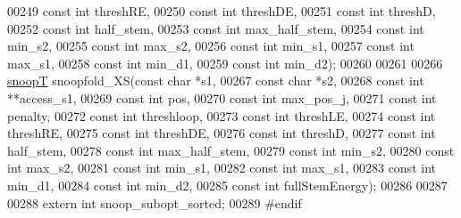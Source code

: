 \begin{DoxyCode}
00249                     \textcolor{keyword}{const} \textcolor{keywordtype}{int}   threshRE,
00250                     \textcolor{keyword}{const} \textcolor{keywordtype}{int}   threshDE,
00251                     \textcolor{keyword}{const} \textcolor{keywordtype}{int}   threshD,
00252                     \textcolor{keyword}{const} \textcolor{keywordtype}{int}   half\_stem,
00253                     \textcolor{keyword}{const} \textcolor{keywordtype}{int}   max\_half\_stem,
00254                     \textcolor{keyword}{const} \textcolor{keywordtype}{int}   min\_s2,
00255                     \textcolor{keyword}{const} \textcolor{keywordtype}{int}   max\_s2,
00256                     \textcolor{keyword}{const} \textcolor{keywordtype}{int}   min\_s1,
00257                     \textcolor{keyword}{const} \textcolor{keywordtype}{int}   max\_s1,
00258                     \textcolor{keyword}{const} \textcolor{keywordtype}{int}   min\_d1,
00259                     \textcolor{keyword}{const} \textcolor{keywordtype}{int}   min\_d2);
00260 
00261 
00266 \hyperlink{group__data__structures_structsnoopT}{snoopT} snoopfold\_XS(\textcolor{keyword}{const} \textcolor{keywordtype}{char}  *s1,
00267                     \textcolor{keyword}{const} \textcolor{keywordtype}{char}  *s2,
00268                     \textcolor{keyword}{const} \textcolor{keywordtype}{int}   **access\_s1,
00269                     \textcolor{keyword}{const} \textcolor{keywordtype}{int}   pos,
00270                     \textcolor{keyword}{const} \textcolor{keywordtype}{int}   max\_pos\_j,
00271                     \textcolor{keyword}{const} \textcolor{keywordtype}{int}   penalty,
00272                     \textcolor{keyword}{const} \textcolor{keywordtype}{int}   threshloop,
00273                     \textcolor{keyword}{const} \textcolor{keywordtype}{int}   threshLE,
00274                     \textcolor{keyword}{const} \textcolor{keywordtype}{int}   threshRE,
00275                     \textcolor{keyword}{const} \textcolor{keywordtype}{int}   threshDE,
00276                     \textcolor{keyword}{const} \textcolor{keywordtype}{int}   threshD,
00277                     \textcolor{keyword}{const} \textcolor{keywordtype}{int}   half\_stem,
00278                     \textcolor{keyword}{const} \textcolor{keywordtype}{int}   max\_half\_stem,
00279                     \textcolor{keyword}{const} \textcolor{keywordtype}{int}   min\_s2,
00280                     \textcolor{keyword}{const} \textcolor{keywordtype}{int}   max\_s2,
00281                     \textcolor{keyword}{const} \textcolor{keywordtype}{int}   min\_s1,
00282                     \textcolor{keyword}{const} \textcolor{keywordtype}{int}   max\_s1,
00283                     \textcolor{keyword}{const} \textcolor{keywordtype}{int}   min\_d1,
00284                     \textcolor{keyword}{const} \textcolor{keywordtype}{int}   min\_d2,
00285                     \textcolor{keyword}{const} \textcolor{keywordtype}{int}   fullStemEnergy);
00286 
00287 
00288 \textcolor{keyword}{extern} \textcolor{keywordtype}{int} snoop\_subopt\_sorted;
00289 \textcolor{preprocessor}{#endif}
\end{DoxyCode}
